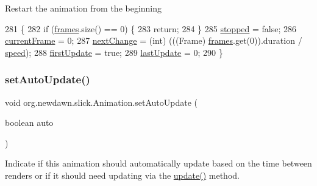 Restart the animation from the beginning 
\begin{DoxyCode}
281                           \{
282         \textcolor{keywordflow}{if} (\mbox{\hyperlink{classorg_1_1newdawn_1_1slick_1_1_animation_a39f0c6a16e479985b22f7dd3bb781bf7}{frames}}.size() == 0) \{
283             \textcolor{keywordflow}{return};
284         \}
285         \mbox{\hyperlink{classorg_1_1newdawn_1_1slick_1_1_animation_ab5b77fdd8772bd15d24ea9d21fa3873d}{stopped}} = \textcolor{keyword}{false};
286         \mbox{\hyperlink{classorg_1_1newdawn_1_1slick_1_1_animation_a358e1f2b9d9a05f83a416405e6bcd332}{currentFrame}} = 0;
287         \mbox{\hyperlink{classorg_1_1newdawn_1_1slick_1_1_animation_a28280195bf1df3c929ca69b1c4d59443}{nextChange}} = (int) (((Frame) \mbox{\hyperlink{classorg_1_1newdawn_1_1slick_1_1_animation_a39f0c6a16e479985b22f7dd3bb781bf7}{frames}}.get(0)).duration / 
      \mbox{\hyperlink{classorg_1_1newdawn_1_1slick_1_1_animation_a0ccda8ed8082763a52d2819e414dd5b9}{speed}});
288         \mbox{\hyperlink{classorg_1_1newdawn_1_1slick_1_1_animation_a1ddf04d31c943c41b82efbd1f2179d77}{firstUpdate}} = \textcolor{keyword}{true};
289         \mbox{\hyperlink{classorg_1_1newdawn_1_1slick_1_1_animation_a5f6bf06ad6ea524d644858261b221794}{lastUpdate}} = 0;
290     \}
\end{DoxyCode}
\mbox{\label{classorg_1_1newdawn_1_1slick_1_1_animation_ab7cbb6c10bf1678b0041d6d9a074a585}} 
\subsubsection{\texorpdfstring{set\+Auto\+Update()}{setAutoUpdate()}}
{\footnotesize\ttfamily void org.\+newdawn.\+slick.\+Animation.\+set\+Auto\+Update (\begin{DoxyParamCaption}\item[{boolean}]{auto }\end{DoxyParamCaption})\hspace{0.3cm}{\ttfamily [inline]}}

Indicate if this animation should automatically update based on the time between renders or if it should need updating via the \mbox{\hyperlink{classorg_1_1newdawn_1_1slick_1_1_animation_a24420dcd4e89ff617ed52a265e014ba5}{update()}} method.


